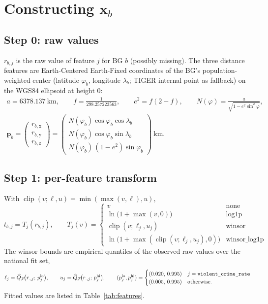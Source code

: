 \documentclass[11pt]{article}
\newcommand{\x}{\mathbf{x}}
\newcommand{\clip}{\operatorname{clip}}
\newcommand{\ft}[1]{\texttt{\detokenize{#1}}}
\begin{document}
\section{Constructing \texorpdfstring{$\x_b$}{x\_b}}

\subsection{Step 0: raw values}

$r_{b,j}$ is the raw value of feature $j$ for BG $b$ (possibly missing). The three distance
features are Earth-Centered Earth-Fixed coordinates of the BG's population-weighted center
(latitude $\varphi_b$, longitude $\lambda_b$; TIGER internal point as fallback) on the WGS84
ellipsoid at height $0$:
\begin{gather*}
a = 6378.137\ \text{km},\qquad f=\tfrac{1}{298.257223563},\qquad e^2=f(2-f),\qquad
N(\varphi)=\frac{a}{\sqrt{1-e^2\sin^2\varphi}},\\[4pt]
\mathbf p_b=\begin{pmatrix} r_{b,\mathrm{x}}\\ r_{b,\mathrm{y}}\\ r_{b,\mathrm{z}}\end{pmatrix}
=\begin{pmatrix}
N(\varphi_b)\cos\varphi_b\cos\lambda_b\\
N(\varphi_b)\cos\varphi_b\sin\lambda_b\\
N(\varphi_b)\,(1-e^2)\sin\varphi_b
\end{pmatrix}\ \text{km}.
\end{gather*}

\subsection{Step 1: per-feature transform}

With $\clip(v;\ell,u)=\min(\max(v,\ell),u)$,
\[
t_{b,j}=T_j(r_{b,j}),\qquad
T_j(v)=\begin{cases}
v & \text{none}\\[2pt]
\ln\!\bigl(1+\max(v,0)\bigr) & \text{log1p}\\[2pt]
\clip(v;\ell_j,u_j) & \text{winsor}\\[2pt]
\ln\!\bigl(1+\max(\clip(v;\ell_j,u_j),0)\bigr) & \text{winsor\_log1p}
\end{cases}
\]
The winsor bounds are empirical quantiles of the observed raw values over the national fit
set,
\[
\ell_j=\widehat Q_{\mathcal F}\!\bigl(r_{\cdot,j};\,p^{\mathrm{lo}}_j\bigr),\qquad
u_j=\widehat Q_{\mathcal F}\!\bigl(r_{\cdot,j};\,p^{\mathrm{hi}}_j\bigr),\qquad
(p^{\mathrm{lo}}_j,p^{\mathrm{hi}}_j)=\begin{cases}(0.020,\,0.995) & j=\ft{violent_crime_rate}\\
(0.005,\,0.995) & \text{otherwise.}\end{cases}
\]
Fitted values are listed in Table~\ref{tab:features}.
\end{document}
